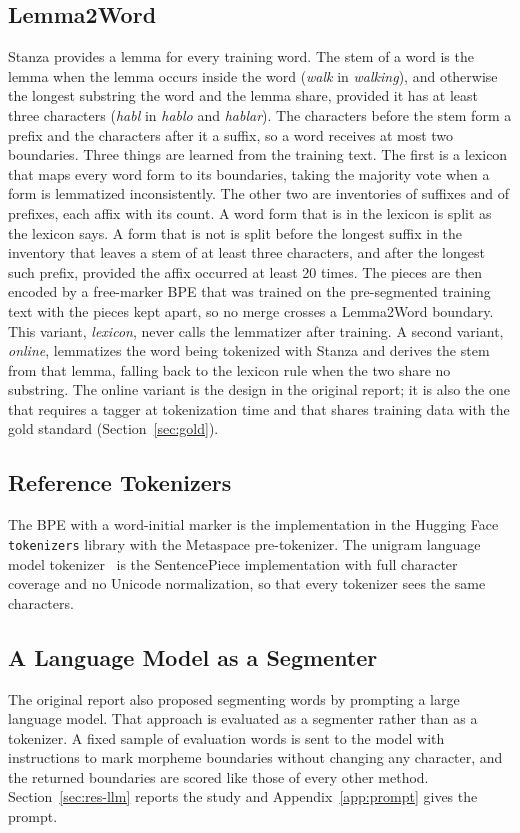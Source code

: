 \subsection{Lemma2Word}\label{sec:l2w}
Stanza provides a lemma for every training word.
The stem of a word is the lemma when the lemma occurs inside the word (\emph{walk} in \emph{walking}), and otherwise the longest substring the word and the lemma share, provided it has at least three characters (\emph{habl} in \emph{hablo} and \emph{hablar}).
The characters before the stem form a prefix and the characters after it a suffix, so a word receives at most two boundaries.
Three things are learned from the training text. The first is a lexicon that maps every word form to its boundaries, taking the majority vote when a form is lemmatized inconsistently. The other two are inventories of suffixes and of prefixes, each affix with its count.
A word form that is in the lexicon is split as the lexicon says.
A form that is not is split before the longest suffix in the inventory that leaves a stem of at least three characters, and after the longest such prefix, provided the affix occurred at least 20 times.
The pieces are then encoded by a free-marker BPE that was trained on the pre-segmented training text with the pieces kept apart, so no merge crosses a Lemma2Word boundary.
This variant, \emph{lexicon}, never calls the lemmatizer after training.
A second variant, \emph{online}, lemmatizes the word being tokenized with Stanza and derives the stem from that lemma, falling back to the lexicon rule when the two share no substring.
The online variant is the design in the original report; it is also the one that requires a tagger at tokenization time and that shares training data with the gold standard (Section~\ref{sec:gold}).

\subsection{Reference Tokenizers}
The BPE with a word-initial marker is the implementation in the Hugging Face \texttt{tokenizers} library with the Metaspace pre-tokenizer.
The unigram language model tokenizer~\cite{kudo2018subword} is the SentencePiece implementation with full character coverage and no Unicode normalization, so that every tokenizer sees the same characters.

\subsection{A Language Model as a Segmenter}\label{sec:llm}
The original report also proposed segmenting words by prompting a large language model.
That approach is evaluated as a segmenter rather than as a tokenizer. A fixed sample of evaluation words is sent to the model with instructions to mark morpheme boundaries without changing any character, and the returned boundaries are scored like those of every other method.
Section~\ref{sec:res-llm} reports the study and Appendix~\ref{app:prompt} gives the prompt.
